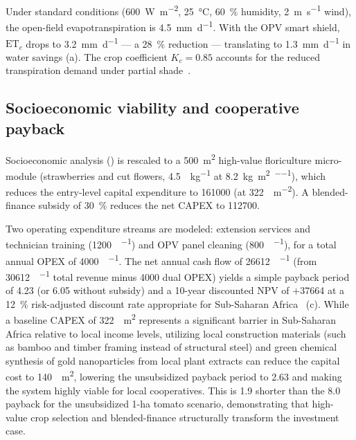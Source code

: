 \documentclass[onecolumn,a4paper,12pt]{article}
\begin{document}
Under standard conditions (\qty{600}{\W\per\m\squared}, \qty{25}{\celsius}, \qty{60}{\percent} humidity, \qty{2}{\m\per\s} wind), the open-field evapotranspiration is \qty{4.5}{\mm\per\day}.
With the OPV smart shield, $\mathrm{ET}_c$ drops to \qty{3.2}{\mm\per\day} --- a \qty{28}{\percent} reduction --- translating to \qty{1.3}{\mm\per\day} in water savings (a).
The crop coefficient $K_c = 0.85$ accounts for the reduced transpiration demand under partial shade~\cite{Allen1998}.

\subsection*{Socioeconomic viability and cooperative payback}

Socioeconomic analysis () is rescaled to a \qty{500}{\m\squared} high-value floriculture micro-module (strawberries and cut flowers, \qty{4.5}{\USD\per\kg} at \qty{8.2}{\kg\per\m\squared\per\yr}), which reduces the entry-level capital expenditure to \qty{161000}{\USD} (at \qty{322}{\USD\per\m\squared}).
A blended-finance subsidy of \qty{30}{\percent} reduces the net CAPEX to \qty{112700}{\USD}.

Two operating expenditure streams are modeled: extension services and technician training (\qty{1200}{\USD\per\yr}) and OPV panel cleaning (\qty{800}{\USD\per\yr}), for a total annual OPEX of \qty{4000}{\USD\per\yr}.
The net annual cash flow of \qty{26612}{\USD\per\yr} (from \qty{30612}{\USD\per\yr} total revenue minus \qty{4000}{\USD} dual OPEX) yields a simple payback period of \qty{4.23}{\yr} (or \qty{6.05}{\yr} without subsidy) and a 10-year discounted NPV of $+$\qty{37664}{\USD} at a \qty{12}{\percent} risk-adjusted discount rate appropriate for Sub-Saharan Africa~\cite{Ringstrom2026} (c).
While a baseline CAPEX of \qty{322}{\per\m\squared} represents a significant barrier in Sub-Saharan Africa relative to local income levels, utilizing local construction materials (such as bamboo and timber framing instead of structural steel) and green chemical synthesis of gold nanoparticles from local plant extracts can reduce the capital cost to \qty{140}{\per\m\squared}, lowering the unsubsidized payback period to \qty{2.63}{\yr} and making the system highly viable for local cooperatives.
This is \qty{1.9}{\times} shorter than the \qty{8.0}{\yr} payback for the unsubsidized 1-ha tomato scenario, demonstrating that high-value crop selection and blended-finance structurally transform the investment case.
\end{document}

